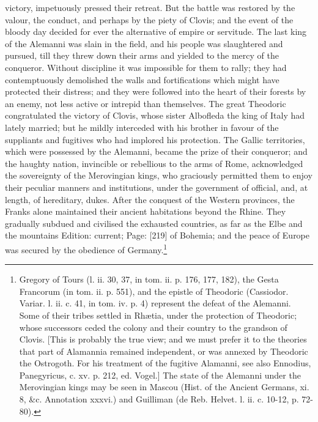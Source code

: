 victory, impetuously pressed their retreat. But the battle was restored by the valour, the conduct, and perhaps by the piety of Clovis; and the event of the bloody day decided for ever the alternative of empire or servitude. The last king of the Alemanni was slain in the field, and his people was slaughtered and pursued, till they threw down their arms and yielded to the mercy of the conqueror. Without discipline it was impossible for them to rally; they had contemptuously demolished the walls and fortifications which might have protected their distress; and they were followed into the heart of their forests by an enemy, not less active or intrepid than themselves. The great Theodoric congratulated the victory of Clovis, whose sister Albofleda the king of Italy had lately married; but he mildly interceded with his brother in favour of the suppliants and fugitives who had implored his protection. The Gallic territories, which were possessed by the Alemanni, became the prize of their conqueror; and the haughty nation, invincible or rebellious to the arms of Rome, acknowledged the sovereignty of the Merovingian kings, who graciously permitted them to enjoy their peculiar manners and institutions, under the government of official, and, at length, of hereditary, dukes. After the conquest of the Western provinces, the Franks alone maintained their ancient habitations beyond the Rhine. They gradually subdued and civilised the exhausted countries, as far as the Elbe and the mountains Edition: current; Page: [219] of Bohemia; and the peace of Europe was secured by the obedience of Germany.\footnote{Gregory of Tours (l. ii. 30, 37, in tom. ii. p. 176, 177, 182), the Gesta Francorum (in tom. ii. p. 551), and the epistle of Theodoric (Cassiodor. Variar. l. ii. c. 41, in tom. iv. p. 4) represent the defeat of the Alemanni. Some of their tribes settled in Rhætia, under the protection of Theodoric; whose successors ceded the colony and their country to the grandson of Clovis. [This is probably the true view; and we must prefer it to the theories that part of Alamannia remained independent, or was annexed by Theodoric the Ostrogoth. For his treatment of the fugitive Alamanni, see also Ennodius, Panegyricus, c. xv. p. 212, ed. Vogel.] The state of the Alemanni under the Merovingian kings may be seen in Mascou (Hist. of the Ancient Germans, xi. 8, \&c. Annotation xxxvi.) and Guilliman (de Reb. Helvet. l. ii. c. 10-12, p. 72-80).}

